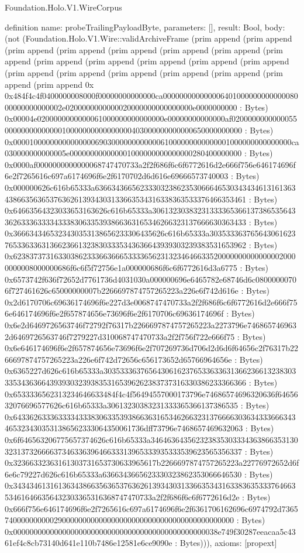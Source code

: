 \begin{lexlean}{Foundation.Holo.V1.WireCorpus}
\begin{semanticmodule}
definition{
  name: probeTrailingPayloadByte,
  parameters: [],
  result: Bool,
  body: (not (Foundation.Holo.V1.Wire::validArchiveFrame (prim append (prim append (prim append (prim append (prim append (prim append (prim append (prim append (prim append (prim append (prim append (prim append (prim append (prim append (prim append (prim append (prim append (prim append (prim append (prim append 0x 0x484f4c4f0400000008000f00000000000000ca00000000000000640100000000000008000000000000002e0200000000000020000000000000000e0000000000 : Bytes) 0x00004e0200000000000061000000000000000e00000000000000af02000000000000550000000000000010000000000000000403000000000000650000000000 : Bytes) 0x00001000000000000000690300000000000061000000000000001000000000000000ca030000000000005e000000000000001000000000000000280400000000 : Bytes) 0x0000af0000000000000068747470733a2f2f686f6c6f6772616d2e666f756e646174696f6e2f7265616c697a6174696f6e2f6170702d6d616e69666573740003 : Bytes) 0x000000626c616b65333a636634366562333032386235306664653034343461316136343866356365376362613934303133663534316338363533376466353461 : Bytes) 0x64663564323033653163626c616b65333a3061323038323133336536613738653564336263336333343338306335393866363165346266323137666630363433 : Bytes) 0x3666343465323430353138656233306435626c616b65333a30353336376564306162376533633631366236613238303335343636643939303239383531653962 : Bytes) 0x6238373731633038623336636665333365623132346466335200000000000000020000000008000000686f6c6f5f72756e1a000000686f6c6f6772616d3a6775 : Bytes) 0x6573742f636f72652d7761736d4031030a000000696e6465782e68746d6c08000000706f727461626c65000000007b2266697874757265223a226e6f742d616e : Bytes) 0x2d6170706c69636174696f6e227d3e0068747470733a2f2f686f6c6f6772616d2e666f756e646174696f6e2f657874656e73696f6e2f6170706c69636174696f : Bytes) 0x6e2d6469726563746f72792f76317b2266697874757265223a2273796e7468657469632d6469726563746f7279227d310068747470733a2f2f756f722e666f75 : Bytes) 0x6e646174696f6e2f657874656e73696f6e2f707269736d706d2d6d6f64656c2f76317b2266697874757265223a226e6f742d72656c656173652d65766964656e : Bytes) 0x6365227d626c616b65333a3035333637656430616237653363363136623661323830333534363664393930323938353165396262383737316330386233366366 : Bytes) 0x6533336562313234646633484f4c4f56494557000173796e74686574696320636f6465632076696577626c616b65333a30613230383231333365366137386535 : Bytes) 0x6433626333633334333830633539386636316534626632313766663036343336663434653234303531386562333064350061736dff73796e7468657469632063 : Bytes) 0x6f646563206775657374626c616b65333a3464636435623238353033343638663531303231373266663734633639646633313965333935333539623565356337 : Bytes) 0x32366332363161303731653730633965617b2266697874757265223a22776972652d6f6e6c79227d626c616b65333a6366343665623330323862353066646530 : Bytes) 0x343434613161363438663563653763626139343031336635343163383635333764663534616466356432303365316368747470733a2f2f686f6c6f6772616d2e : Bytes) 0x666f756e646174696f6e2f7265616c697a6174696f6e2f6361706162696c6974792d736574000000000029000000000000000000000000000000000000000000 : Bytes) 0x00000000000000000000000000000000000000000000000038e749f30287eeacaa5c4361ef4c8cb73140d641e110b7486e12581e6ce9090e : Bytes))),
  axioms: [propext]
}


\end{semanticmodule}
\end{lexlean}
